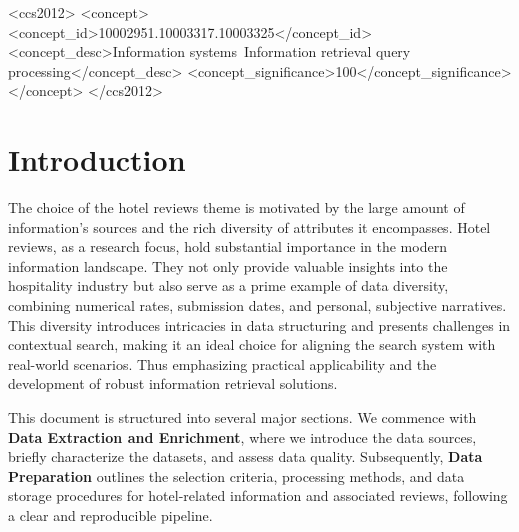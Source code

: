 \documentclass[sigconf]{acmart}
\begin{document}
\begin{CCSXML}
<ccs2012>
<concept>
<concept_id>10002951.10003317.10003325</concept_id>
<concept_desc>Information systems~Information retrieval query processing</concept_desc>
<concept_significance>100</concept_significance>
</concept>
</ccs2012>
\end{CCSXML}





\maketitle

\section{Introduction}


The choice of the hotel reviews theme is motivated by the large amount of information's sources and the rich diversity of attributes it encompasses. Hotel reviews, as a research focus, hold substantial importance in the modern information landscape. They not only provide valuable insights into the hospitality industry but also serve as a prime example of data diversity, combining numerical rates, submission dates, and personal, subjective narratives. This diversity introduces intricacies in data structuring and presents challenges in contextual search, making it an ideal choice for aligning the search system with real-world scenarios. Thus emphasizing practical applicability and the development of robust information retrieval solutions.

This document is structured into several major sections. We commence with \textbf{Data Extraction and Enrichment}, where we introduce the data sources, briefly characterize the datasets, and assess data quality. Subsequently, \textbf{Data Preparation} outlines the selection criteria, processing methods, and data storage procedures for hotel-related information and associated reviews, following a clear and reproducible pipeline.
\end{document}
